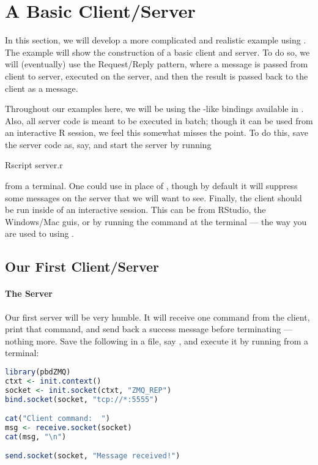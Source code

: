 \section[A Basic Client/Server]{A Basic Client/Server}
\label{sec:backward}


In this section, we will develop a more complicated and realistic example using
.  The example will show the construction of a basic client and
server.  To do so, we will (eventually) use the Request/Reply pattern, where a
message is passed from client to server, executed on the server, and then the
result is passed back to the client as a message.

Throughout our examples here, we will be using the -like bindings 
available in .  Also, all server code is meant to be executed in
batch; though it can be used from an interactive R session, we feel this
somewhat misses the point.  To do this, save the server code as, say,
 and start the server by running
\begin{Command}
Rscript server.r
\end{Command}
from a terminal.  One could use  in place of , 
though by default it will suppress some messages on the server that we will 
want to see.  Finally, the client should be run inside of an interactive
 session.  This can be from RStudio, the Windows/Mac 
guis, or by running the command  at the terminal --- the way you are
used to using .




\subsection{Our First Client/Server}



\paragraph{The Server}
Our first server will be very humble.  It will receive one command from the
client, print that command, and send back a success message before terminating
--- nothing  more.  Save the following in a file, say , and
execute it by running  from a terminal:

\begin{lstlisting}[language=R,title=Server]
library(pbdZMQ)
ctxt <- init.context()
socket <- init.socket(ctxt, "ZMQ_REP")
bind.socket(socket, "tcp://*:5555")

cat("Client command:  ")
msg <- receive.socket(socket)
cat(msg, "\n")

send.socket(socket, "Message received!")
\end{lstlisting}

